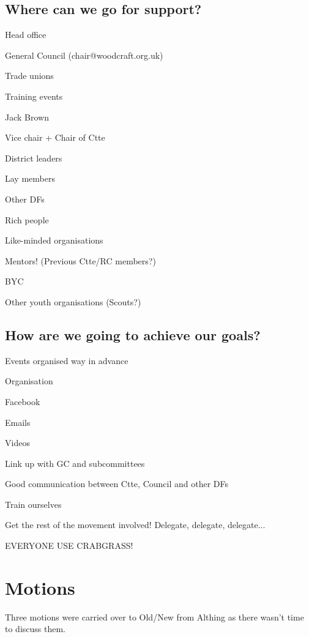 \documentclass[a4paper, 12pt]{article}
\begin{document}
\subsection{Where can we go for support?}
\begin{itemize*}
	\item Head office
	\item General Council (chair@woodcraft.org.uk)
	\item Trade unions
	\item Training events
	\item Jack Brown
	\item Vice chair + Chair of Ctte
	\item District leaders
	\item Lay members
	\item Other DFs
	\item Rich people
	\item Like-minded organisations
	\item Mentors! (Previous Ctte/RC members?)
	\item BYC
	\item Other youth organisations (Scouts?)
\end{itemize*}

\subsection{How are we going to achieve our goals?}
\begin{itemize*}
	\item Events organised way in advance
	\item Organisation
	\item Facebook
	\item Emails
	\item Videos
	\item Link up with GC and subcommittees
	\item Good communication between Ctte, Council and other DFs
	\item Train ourselves
	\item Get the rest of the movement involved! Delegate, delegate, delegate...
	\item EVERYONE USE CRABGRASS!
\end{itemize*}

\section{Motions}
Three motions were carried over to Old/New from Althing as there wasn't time to discuss them.
\end{document}

